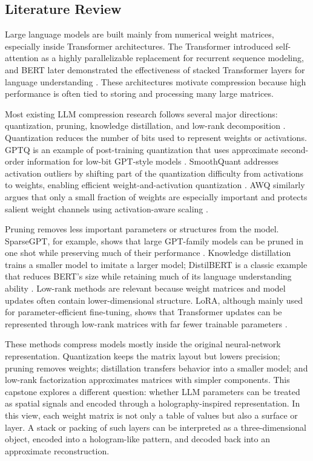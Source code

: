 \documentclass{article}
\begin{document}
\begin{normalsize}
\section{Literature Review}

Large language models are built mainly from numerical weight matrices, especially inside Transformer architectures. The Transformer introduced self-attention as a highly parallelizable replacement for recurrent sequence modeling, and BERT later demonstrated the effectiveness of stacked Transformer layers for language understanding \cite{vaswani2017,devlin2019}. These architectures motivate compression because high performance is often tied to storing and processing many large matrices.

Most existing LLM compression research follows several major directions: quantization, pruning, knowledge distillation, and low-rank decomposition \cite{zhu2024survey}. Quantization reduces the number of bits used to represent weights or activations. GPTQ is an example of post-training quantization that uses approximate second-order information for low-bit GPT-style models \cite{frantar2022gptq}. SmoothQuant addresses activation outliers by shifting part of the quantization difficulty from activations to weights, enabling efficient weight-and-activation quantization \cite{xiao2023smoothquant}. AWQ similarly argues that only a small fraction of weights are especially important and protects salient weight channels using activation-aware scaling \cite{lin2023awq}.

Pruning removes less important parameters or structures from the model. SparseGPT, for example, shows that large GPT-family models can be pruned in one shot while preserving much of their performance \cite{frantar2023sparsegpt}. Knowledge distillation trains a smaller model to imitate a larger model; DistilBERT is a classic example that reduces BERT's size while retaining much of its language understanding ability \cite{sanh2019}. Low-rank methods are relevant because weight matrices and model updates often contain lower-dimensional structure. LoRA, although mainly used for parameter-efficient fine-tuning, shows that Transformer updates can be represented through low-rank matrices with far fewer trainable parameters \cite{hu2021lora}.

These methods compress models mostly inside the original neural-network representation. Quantization keeps the matrix layout but lowers precision; pruning removes weights; distillation transfers behavior into a smaller model; and low-rank factorization approximates matrices with simpler components. This capstone explores a different question: whether LLM parameters can be treated as spatial signals and encoded through a holography-inspired representation. In this view, each weight matrix is not only a table of values but also a surface or layer. A stack or packing of such layers can be interpreted as a three-dimensional object, encoded into a hologram-like pattern, and decoded back into an approximate reconstruction.


\end{normalsize}
\end{document}
